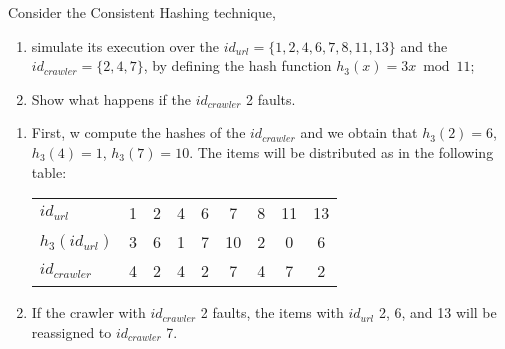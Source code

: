 \exercise

Consider the Consistent Hashing technique,
%
\begin{enumerate}

  \item simulate its execution over the $id_{url} = \{ 1, 2, 4, 6, 7, 8, 11,
  13 \}$ and the $id_{crawler} = \{ 2, 4, 7 \}$, by defining the hash function
  $h_3(x) = 3x \bmod 11$;

  \item Show what happens if the $id_{crawler}$ 2 faults.

\end{enumerate}

\solution

\begin{enumerate}

  \item First, w compute the hashes of the $id_{crawler}$ and we obtain that
  $h_3(2) = 6$, $h_3(4) = 1$, $h_3(7) = 10$. The items will be distributed as in
  the following table:
  \begin{table}[h]
    \centering
    \begin{tabular}{l|c|c|c|c|c|c|c|c}
      $id_{url}$      & 1 & 2 & 4 & 6 & 7 & 8 & 11 & 13 \\
      $h_3(id_{url})$ & 3 & 6 & 1 & 7 & 10 & 2 & 0 & 6 \\ \hline
      $id_{crawler}$  & 4 & 2 & 4 & 2 & 7 & 4 & 7 & 2 \\
    \end{tabular}
  \end{table}

  \item If the crawler with $id_{crawler}$ 2 faults, the items with $id_{url}$
  2, 6, and 13 will be reassigned to $id_{crawler}$ 7.

\end{enumerate}
